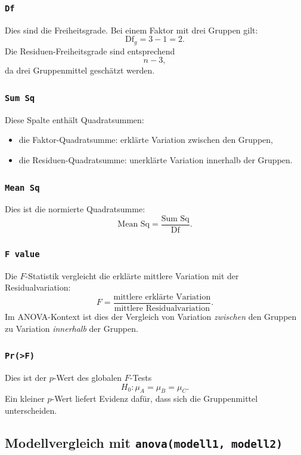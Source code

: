 \documentclass[10pt, letterpaper]{article}
\begin{document}
\subsubsection{\texttt{Df}}

Dies sind die Freiheitsgrade. Bei einem Faktor mit drei Gruppen gilt:
\[
\text{Df}_{g}=3-1=2.
\]
Die Residuen-Freiheitsgrade sind entsprechend
\[
n-3,
\]
da drei Gruppenmittel geschätzt werden.

\subsubsection{\texttt{Sum Sq}}

Diese Spalte enthält Quadratsummen:
\begin{itemize}
    \item die Faktor-Quadratsumme: erklärte Variation zwischen den Gruppen,
    \item die Residuen-Quadratsumme: unerklärte Variation innerhalb der Gruppen.
\end{itemize}

\subsubsection{\texttt{Mean Sq}}

Dies ist die normierte Quadratsumme:
\[
\text{Mean Sq}=\frac{\text{Sum Sq}}{\text{Df}}.
\]

\subsubsection{\texttt{F value}}

Die \(F\)-Statistik vergleicht die erklärte mittlere Variation mit der Residualvariation:
\[
F=\frac{\text{mittlere erklärte Variation}}{\text{mittlere Residualvariation}}.
\]
Im ANOVA-Kontext ist dies der Vergleich von Variation \emph{zwischen} den Gruppen zu Variation \emph{innerhalb} der Gruppen.

\subsubsection{\texttt{Pr(>F)}}

Dies ist der \(p\)-Wert des globalen \(F\)-Tests
\[
H_0:\mu_A=\mu_B=\mu_C.
\]
Ein kleiner \(p\)-Wert liefert Evidenz dafür, dass sich die Gruppenmittel unterscheiden.

\subsection{Modellvergleich mit \texttt{anova(modell1, modell2)}}
\end{document}

